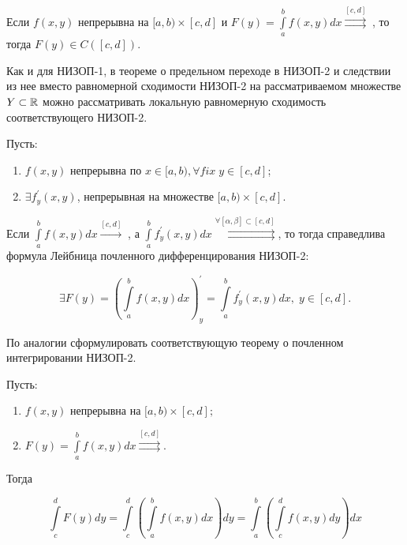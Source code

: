 \documentclass[../../main.tex]{subfiles}
\begin{document}
	\begin{crl*}
		Если $f(x, y)$ непрерывна на $[a, b) \times [c, d]$ и $F(y) = \int\limits_a^b f(x, y) dx \overset{[c, d]}\rightrightarrows \;$, то тогда $F(y) \in C([c, d])$.
	\end{crl*}

	\begin{rem}
		Как и для НИЗОП-1, в теореме о предельном переходе в НИЗОП-2 и следствии из нее вместо равномерной сходимости НИЗОП-2 на рассматриваемом множестве $Y \subset \mathbb{R}$ можно рассматривать локальную равномерную сходимость соответствующего НИЗОП-2.
	\end{rem}

	\begin{thm}
		Пусть:

		\begin{enumerate}
			\item $f(x, y)$ непрерывна по $x \in [a, b), \forall fix \; y \in [c, d]$;
			\item $\exists f^{'}_{y} (x, y)$, непрерывная на множестве $[a, b) \times [c, d]$.
		\end{enumerate}

		Если $\int\limits_a^b f(x, y) dx \overset{[c, d]}\rightarrow\;$, а $\int\limits_a^b f^{'}_y (x, y) dx \overset{\forall [\alpha, \beta] \subset [c, d]}{\rightrightarrows}$, то тогда справедлива формула Лейбница почленного дифференцирования НИЗОП-2:
		
		$$
		\exists F(y) = \left( \int\limits_a^b f(x, y) dx \right)^{'}_y = \int\limits_a^b f^{'}_y (x, y) dx, \; y \in [c, d].
		$$
	\end{thm}

	\begin{exc}
		По аналогии сформулировать соответствующую теорему о почленном интегрировании НИЗОП-2.
	\end{exc}

	\begin{eans}
		Пусть:
		\begin{enumerate}
			\item $f(x, y)$ непрерывна на $[a, b) \times [c, d];$
			\item $F(y) = \int\limits_a^b f(x, y) dx \overset{[c, d]}{\rightrightarrows}.$
		\end{enumerate}
	
		Тогда
		
		$$
			\int\limits_c^d F(y) dy = \int\limits_c^d \left( \int\limits_a^b f(x, y) dx \right) dy = \int\limits_a^b \left( \int\limits_c^d f(x, y) dy \right) dx
		$$
	
	\end{eans}
\end{document}
